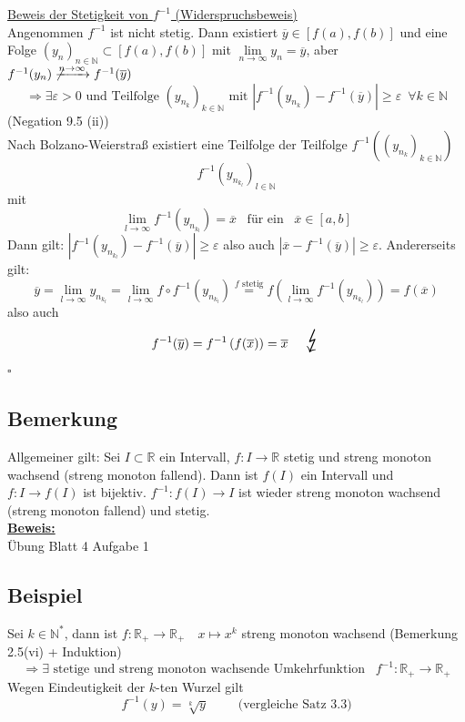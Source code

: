 \underline{Beweis der Stetigkeit von $f ^{-1}$ (Widerspruchsbeweis)} \\
Angenommen $f ^{-1}$ ist nicht stetig. Dann existiert $\overline{y} \in [f(a), f(b)]$ und eine Folge 
$(y_n)_{n \in \mathds{N} } \subset [f(a), f(b)]$ mit $\lim\limits_{n \to \infty} y_n = \overline{y}$, aber 
$f ^{-1} (y_n) \not\xrightarrow{n \to \infty} f ^{-1} (\overline{y})$
\[
	\Rightarrow \exists \varepsilon >0 \text{ und Teilfolge } (y_{n_k})_{k \in \mathds{N}} \text{ mit } 
	\left| f ^{-1} (y_{n_k}) - f ^{-1} (\overline{y})\right| \ge \varepsilon \enspace \forall k \in \mathds{N}
\]
(Negation 9.5 (ii))
\vspace{\baselineskip} \\
Nach Bolzano-Weierstraß existiert eine Teilfolge der Teilfolge $ f^{-1} \left( \left(y_{n_k}\right)_{k \in \mathds{N}}\right) $
\[
	f ^{-1} \left(y_{n_{k_l}}\right)_{l \in \mathds{N}} 
\]
mit
\[
	\lim\limits_{l \to \infty} f ^{-1} \left(y_{n_{k_l}}\right) = \overline{x} \enspace \text{ für ein } \enspace \overline{x} \in [a,b]
\]
Dann gilt: $\left| f ^{-1} \left(y_{n_{k_l}}\right) - f ^{-1} (\overline{y}) \right| \ge \varepsilon$ also auch 
$\left| \overline{x} - f ^{-1}(\overline{y}) \right| \ge \varepsilon$. Andererseits gilt:
\[
	\overline{y}= \lim\limits_{l \to \infty} y_{n_{k_l}} = \lim\limits_{l \to \infty} f \circ f ^{-1} \left(y_{n_{k_l}}\right) 
	\overset{f \text{ stetig}}{=} f \left( \lim\limits_{l \to \infty} f ^{-1} \left(y_{n_{k_l}}\right) \right) = f (\overline{x})	
\]
also auch
\[
	f ^{-1} (\overline{y}) = f ^{-1} \left( f (\overline{x})\right) = \overline{x} \quad \text{ {\huge $\lightning$}}
\]
\hfill \( \square \)

\subsection{Bemerkung} %
\label{sub:bemerkung}
Allgemeiner gilt: Sei $I \subset \mathds{R}$ ein Intervall, $f: I \to \mathds{R}$ stetig und streng monoton wachsend (streng monoton fallend). Dann ist 
$f(I)$ ein Intervall und $f : I \to f(I)$ ist bijektiv. $f ^{-1} : f(I) \to I$ ist wieder streng monoton wachsend (streng monoton fallend) und stetig.
\vspace{\baselineskip} \\
\underline{\textbf{Beweis:}} \\
Übung Blatt 4 Aufgabe 1

\subsection{Beispiel} %
\label{sub:beispiel}
Sei $k \in \mathds{N}^*$, dann ist $f : \mathds{R}_+ \to \mathds{R}_+ \quad x \mapsto x^k$ streng monoton wachsend (Bemerkung 2.5(vi) + Induktion)
\[
	\Rightarrow \exists \text{ stetige und streng monoton wachsende Umkehrfunktion } \enspace f ^{-1} : \mathds{R}_+ \to \mathds{R}_+
\]
Wegen Eindeutigkeit der $k$-ten Wurzel gilt
\[
	f ^{-1} (y) = \sqrt[k]{y} \qquad \text{ (vergleiche Satz 3.3)}
\]

